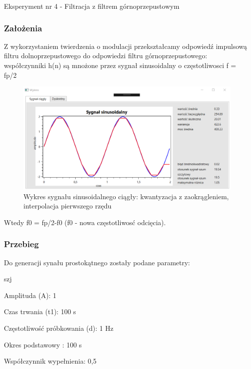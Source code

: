 \documentclass[12pt]{article}
\begin{document}
Eksperyment nr 4  - Filtracja z filtrem górnoprzepustowym
\subsubsection{Założenia}
Z wykorzystaniem twierdzenia o modulacji przekształcamy odpowiedź impulsową filtru dolnoprzepustowego do odpowiedzi filtru górnoprzepustowego:
współczynniki h(n) są mnożone przez sygnał sinusoidalny  o częstotliwosci f = fp/2

\begin{figure}[h!]
 \centering
 \includegraphics[width=12.3cm]{SinKwantZaokrIntA2T2f10H2t1C.PNG}
 \vspace{-0.3cm}
 \caption{Wykres sygnału sinusoidalnego ciągły: kwantyzacja z zaokrągleniem, interpolacja pierwszego rzędu}
 \label{Wykres dla wyników eksperymentu drugiego}
\end{figure}

Wtedy f0 = fp/2-f0 (f0 -  nowa częstotliwosć odcięcia).

\subsubsection{Przebieg}
Do generacji synału prostokątnego zostały podane parametry:

\begin{labeling}{szj}
\item [Amplituda (A):] 1
\item [Czas trwania (t1):] 100 s
\item [Częstotliwość próbkowania (d): ] 1 Hz
\item [Okres podstawowy :] 100 s
\item [Współczynnik wypełnienia:] 0,5
\end{labeling}
\end{document}
